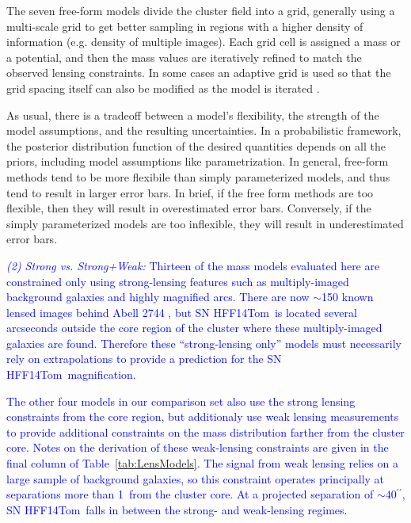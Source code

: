 \documentclass[iop]{emulateapj}
\newcommand{\change}[1]{{ \textcolor{blue}{#1}}}
\newcommand{\change}[1]{#1}
\def\tomas{HFF14Tom}
\def\arcsec{\ensuremath{^{\prime\prime}}}
\begin{document}
The seven free-form models divide the cluster field into a grid,
generally using a multi-scale grid to get better sampling in regions
with a higher density of information (e.g. density of multiple
images). Each grid cell is assigned a mass or a potential, and then
the mass values are iteratively refined to match the observed lensing
constraints. In some cases an adaptive grid is used so that the grid
spacing itself can also be modified as the model is
iterated \citep[e.g.][]{Liesenborgs:2006,Merten:2009,Bradac:2009}.

As usual, there is a tradeoff between a model's flexibility, the
strength of the model assumptions, and the resulting uncertainties. In
a probabilistic framework, the posterior distribution function of the
desired quantities depends on all the priors, including model
assumptions like parametrization.  In general, free-form methods tend
to be more flexibile than simply parameterized models, and thus tend
to result in larger error bars.  In brief, if the free form methods
are too flexible, then they will result in overestimated error
bars. Conversely, if the simply parameterized models are too
inflexible, they will result in underestimated error bars.

\smallskip
\change{{\it (2) Strong vs. Strong+Weak:}}
\change{Thirteen of the mass models evaluated here are constrained only using
strong-lensing features such as multiply-imaged background galaxies
and highly magnified arcs.  There are now $\sim$150 known lensed
images behind Abell 2744 \citep{Jauzac:2015b}, but SN \tomas\ is
located several arcseconds outside the core region of the cluster
where these multiply-imaged galaxies are found.  Therefore these
``strong-lensing only'' models must necessarily rely on extrapolations
to provide a prediction for the SN \tomas\ magnification.}

\change{The other four models in our comparison set also use the strong
lensing constraints from the core region, but additionaly use
weak lensing measurements to provide additional constraints on the
mass distribution farther from the cluster core.  Notes on the
derivation of these weak-lensing constraints are given in the final
column of Table~\ref{tab:LensModels}.  The signal from weak lensing
relies on a large sample of background galaxies, so this constraint
operates principally at separations more than 1\arcmin\ from the
cluster core.  At a projected separation of $\sim40\arcsec$,
SN \tomas\ falls in between the strong- and weak-lensing regimes. }
\end{document}
